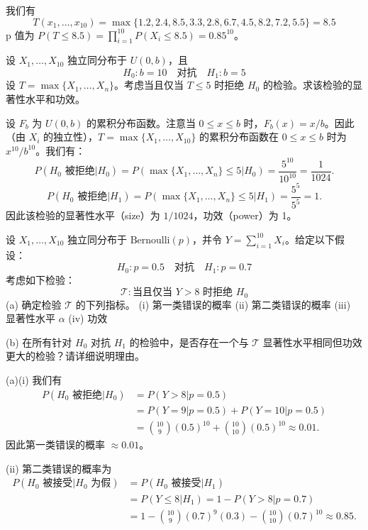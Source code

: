 \begin{questions}
\begin{solution}
我们有
\[
T(x_1, \dots, x_{10}) = \max\{1.2, 2.4, 8.5, 3.3, 2.8, 6.7, 4.5, 8.2, 7.2, 5.5\} = 8.5
\]
p 值为 $P(T \le 8.5) = \prod_{i=1}^{10} P(X_i \le 8.5) = 0.85^{10}$。
\end{solution}

\question 设 $X_1, \dots, X_{10}$ 独立同分布于 $U(0, b)$，且
\[
H_0 : b = 10 \quad \text{对抗} \quad H_1 : b = 5
\]
设 $T = \max\{X_1, \dots, X_n\}$。考虑当且仅当 $T \le 5$ 时拒绝 $H_0$ 的检验。求该检验的显著性水平和功效。

\begin{solution}
设 $F_b$ 为 $U(0, b)$ 的累积分布函数。注意当 $0 \le x \le b$ 时，$F_b(x) = x/b$。因此（由 $X_i$ 的独立性），$T = \max\{X_1, \dots, X_{10}\}$ 的累积分布函数在 $0 \le x \le b$ 时为 $x^{10}/b^{10}$。我们有：
\[
P(H_0 \text{ 被拒绝} | H_0) = P(\max\{X_1, \dots, X_n\} \le 5 | H_0) = \frac{5^{10}}{10^{10}} = \frac{1}{1024}.
\]
\[
P(H_0 \text{ 被拒绝} | H_1) = P(\max\{X_1, \dots, X_n\} \le 5 | H_1) = \frac{5^5}{5^5} = 1.
\]
因此该检验的显著性水平（size）为 $1/1024$，功效（power）为 1。
\end{solution}

\question 设 $X_1, \dots, X_{10}$ 独立同分布于 $\text{Bernoulli}(p)$，并令 $Y = \sum_{i=1}^{10} X_i$。给定以下假设：
\[
H_0 : p = 0.5 \quad \text{对抗} \quad H_1 : p = 0.7
\]
考虑如下检验：
\[
\mathcal{T} : \text{当且仅当 } Y > 8 \text{ 时拒绝 } H_0
\]
(a) 确定检验 $\mathcal{T}$ 的下列指标。
(i) 第一类错误的概率
(ii) 第二类错误的概率
(iii) 显著性水平 $\alpha$
(iv) 功效

(b) 在所有针对 $H_0$ 对抗 $H_1$ 的检验中，是否存在一个与 $\mathcal{T}$ 显著性水平相同但功效更大的检验？请详细说明理由。

\begin{solution}
(a)(i) 我们有
\begin{align*}
P(H_0 \text{ 被拒绝} | H_0) &= P(Y > 8 | p = 0.5) \\
&= P(Y = 9 | p = 0.5) + P(Y = 10 | p = 0.5) \\
&= \binom{10}{9}(0.5)^{10} + \binom{10}{10}(0.5)^{10} \approx 0.01.
\end{align*}
因此第一类错误的概率 $\approx 0.01$。

(ii) 第二类错误的概率为
\begin{align*}
P(H_0 \text{ 被接受} | H_0 \text{ 为假}) &= P(H_0 \text{ 被接受} | H_1) \\
&= P(Y \le 8 | H_1) = 1 - P(Y > 8 | p = 0.7) \\
&= 1 - \binom{10}{9}(0.7)^9(0.3) - \binom{10}{10}(0.7)^{10} \approx 0.85.
\end{align*}


\end{solution}
\end{questions}
